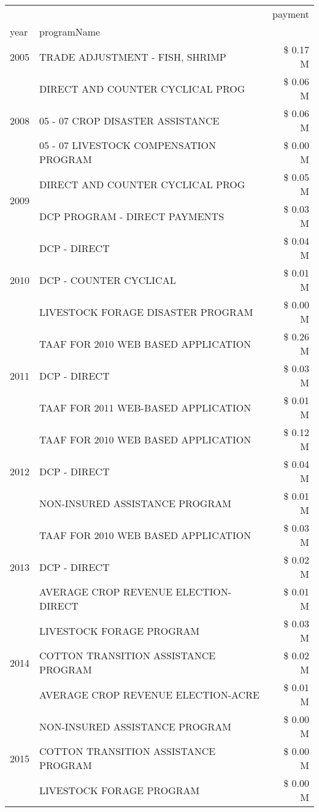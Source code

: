 \begin{tabular}{llr}
\toprule
 &  & payment \\
year & programName &  \\
\midrule
2005 & TRADE ADJUSTMENT - FISH, SHRIMP & \$ 0.17 M \\
\cline{1-3}
\multirow[t]{3}{*}{2008} & DIRECT AND COUNTER CYCLICAL PROG & \$ 0.06 M \\
 & 05 - 07 CROP DISASTER ASSISTANCE & \$ 0.06 M \\
 & 05 - 07 LIVESTOCK COMPENSATION PROGRAM & \$ 0.00 M \\
\cline{1-3}
\multirow[t]{2}{*}{2009} & DIRECT AND COUNTER CYCLICAL PROG & \$ 0.05 M \\
 & DCP PROGRAM - DIRECT PAYMENTS & \$ 0.03 M \\
\cline{1-3}
\multirow[t]{3}{*}{2010} & DCP - DIRECT & \$ 0.04 M \\
 & DCP - COUNTER CYCLICAL & \$ 0.01 M \\
 & LIVESTOCK FORAGE DISASTER PROGRAM & \$ 0.00 M \\
\cline{1-3}
\multirow[t]{3}{*}{2011} & TAAF FOR 2010 WEB BASED APPLICATION & \$ 0.26 M \\
 & DCP - DIRECT & \$ 0.03 M \\
 & TAAF FOR 2011 WEB-BASED APPLICATION & \$ 0.01 M \\
\cline{1-3}
\multirow[t]{3}{*}{2012} & TAAF FOR 2010 WEB BASED APPLICATION & \$ 0.12 M \\
 & DCP - DIRECT & \$ 0.04 M \\
 & NON-INSURED ASSISTANCE PROGRAM & \$ 0.01 M \\
\cline{1-3}
\multirow[t]{3}{*}{2013} & TAAF FOR 2010 WEB BASED APPLICATION & \$ 0.03 M \\
 & DCP - DIRECT & \$ 0.02 M \\
 & AVERAGE CROP REVENUE ELECTION-DIRECT & \$ 0.01 M \\
\cline{1-3}
\multirow[t]{3}{*}{2014} & LIVESTOCK FORAGE PROGRAM & \$ 0.03 M \\
 & COTTON TRANSITION ASSISTANCE PROGRAM & \$ 0.02 M \\
 & AVERAGE CROP REVENUE ELECTION-ACRE & \$ 0.01 M \\
\cline{1-3}
\multirow[t]{3}{*}{2015} & NON-INSURED ASSISTANCE PROGRAM & \$ 0.00 M \\
 & COTTON TRANSITION ASSISTANCE PROGRAM & \$ 0.00 M \\
 & LIVESTOCK FORAGE PROGRAM & \$ 0.00 M \\
\cline{1-3}

\end{tabular}
